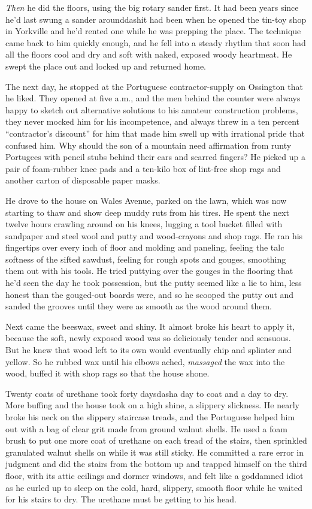\textit{Then} he did the floors, using the big rotary sander first. 
It had been years since he'd last swung a sander arounddash{}it had been
when he opened the tin-toy shop in Yorkville and he'd rented one while
he was prepping the place.  The technique came back to him quickly
enough, and he fell into a steady rhythm that soon had all the floors
cool and dry and soft with naked, exposed woody heartmeat.  He swept
the place out and locked up and returned home.

The next day, he stopped at the Portuguese contractor-supply on
Ossington that he liked.  They opened at five a.m., and the men behind
the counter were always happy to sketch out alternative solutions to
his amateur construction problems, they never mocked him for his
incompetence, and always threw in a ten percent ``contractor's
discount'' for him that made him swell up with irrational pride that
confused him.  Why should the son of a mountain need affirmation from
runty Portugees with pencil stubs behind their ears and scarred
fingers?  He picked up a pair of foam-rubber knee pads and a ten-kilo
box of lint-free shop rags and another carton of disposable paper
masks.

He drove to the house on Wales Avenue, parked on the lawn, which was
now starting to thaw and show deep muddy ruts from his tires.  He
spent the next twelve hours crawling around on his knees, lugging a
tool bucket filled with sandpaper and steel wool and putty and
wood-crayons and shop rags.  He ran his fingertips over every inch of
floor and molding and paneling, feeling the talc softness of the
sifted sawdust, feeling for rough spots and gouges, smoothing them out
with his tools.  He tried puttying over the gouges in the flooring
that he'd seen the day he took possession, but the putty seemed like a
lie to him, less honest than the gouged-out boards were, and so he
scooped the putty out and sanded the grooves until they were as smooth
as the wood around them.

Next came the beeswax, sweet and shiny.  It almost broke his heart to
apply it, because the soft, newly exposed wood was so deliciously
tender and sensuous.  But he knew that wood left to its own would
eventually chip and splinter and yellow.  So he rubbed wax until his
elbows ached, \textit{massaged} the wax into the wood, buffed it with
shop rags so that the house shone.

Twenty coats of urethane took forty daysdash{}a day to coat and a day to
dry.  More buffing and the house took on a high shine, a slippery
slickness.  He nearly broke his neck on the slippery staircase treads,
and the Portuguese helped him out with a bag of clear grit made from
ground walnut shells.  He used a foam brush to put one more coat of
urethane on each tread of the stairs, then sprinkled granulated walnut
shells on while it was still sticky.  He committed a rare error in
judgment and did the stairs from the bottom up and trapped himself on
the third floor, with its attic ceilings and dormer windows, and felt
like a goddamned idiot as he curled up to sleep on the cold, hard,
slippery, smooth floor while he waited for his stairs to dry.  The
urethane must be getting to his head.

